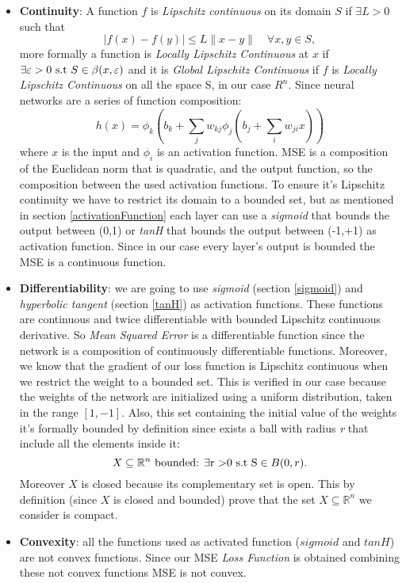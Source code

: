 \begin{itemize}
	\item \textbf{Continuity}: A function $f$ is \textit{ Lipschitz continuous} on its domain $S$ if $\exists L>0$ such that
	\begin{equation}
	|f(x)-f(y)| \leq L\parallel x-y\parallel \quad \forall x,y \in S,  
	\end{equation} 
	more formally a function is  \textit{Locally Lipschitz Continuous} at $x$ if $\exists \varepsilon >0 \textnormal{ s.t } S \in \beta(x,\varepsilon) $
	and it is \textit{Global Lipschitz Continuous} if $f$ is \textit{Locally Lipschitz Continuous} on all the space S, in our case $R^n$.
	Since neural networks are a series of function composition: 
	\begin{equation}
	h(x) = \phi_{k}(b_{k} + \sum_{j}w_{kj} \phi_{j}(b_{j} + \sum_{i}w_{ji}x))
	\end{equation}
	where $x$ is the input and $\phi_{i}$ is an activation function. MSE is a composition of the Euclidean norm that is quadratic, and the output function, so the composition between the used activation functions. To ensure it's Lipschitz continuity we have to restrict its domain to a bounded set, but as mentioned in section \ref{activationFunction} each layer can use a \textit{sigmoid} that bounds the output between (0,1) or \textit{tanH} that bounds the output  between (-1,+1) as activation function. Since in our case every layer's output is bounded the MSE is a continuous function.	
	\item  \textbf{Differentiability}:  we are going to use \textit{sigmoid} (section \ref{sigmoid}) and \textit{hyperbolic tangent} (section \ref{tanH}) as activation functions. These functions are continuous and twice differentiable with bounded Lipschitz continuous derivative. So \textit{Mean Squared Error} is a differentiable function since the network is a composition of continuously differentiable functions. Moreover, we know that the gradient of our loss function is Lipschitz continuous when we restrict the weight to a bounded set. This is verified in our case because the weights of the network are initialized using a uniform distribution, taken in the range $[1,-1]$. Also, this set containing the initial value of the weights it's formally bounded by definition since exists a ball with radius \textit{r} that include all the elements inside it: 
	\begin{equation}
	X \subseteq \mathbb{R}^{n}  \textnormal{ bounded: } \exists  \textnormal{r >0  s.t S}  \in B(0,r).
	\end{equation}
	Moreover $X$ is closed because its complementary set is open. This by definition (since $X$ is closed and bounded) prove that the set $X \subseteq \mathbb{R}^{n}$ we consider is compact.
	\item \textbf{Convexity}: all the functions used as activated function ($sigmoid$ and $tanH$) are not convex functions. Since our MSE \textit{Loss Function} is obtained combining these not convex functions MSE is not convex.
\end{itemize}

